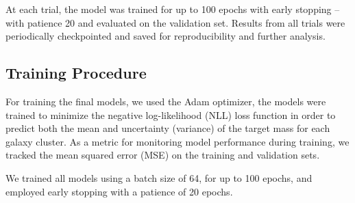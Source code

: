At each trial, the model was trained for up to 100 epochs with early 
stopping --with patience 20 and evaluated on the validation set. Results from all trials were periodically checkpointed and saved for reproducibility and further analysis.


\subsection{Training Procedure}

For training the final models, we used the Adam optimizer, 
the models were trained to minimize the negative log-likelihood (NLL) loss function 
in order to predict 
both the mean and uncertainty (variance) of the target mass 
for each galaxy cluster. As a metric for monitoring model 
performance during training, we tracked the mean squared error 
(MSE) on the training and validation sets.

We trained all models using a batch size of 64, for up to 100 
epochs, and employed early stopping with a patience of 20 epochs. 

